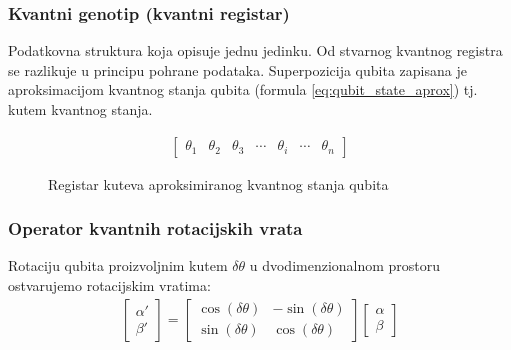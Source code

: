 \documentclass[times, utf8, zavrsni, numeric]{fer}
\begin{document}
\subsubsection{Kvantni genotip (kvantni registar)}
Podatkovna struktura koja opisuje jednu jedinku. Od stvarnog kvantnog registra se razlikuje u principu pohrane podataka. Superpozicija qubita zapisana je aproksimacijom kvantnog stanja qubita (formula \ref{eq:qubit_state_aprox}) tj. kutem kvantnog stanja.
\begin{figure}[htb]
\centering
\begin{align*}
\begin{bmatrix}
\theta_1 & \theta_2 & \theta_3 & \cdots & \theta_i & \cdots & \theta_n
\end{bmatrix}
\end{align*}
\caption{Registar kuteva aproksimiranog kvantnog stanja qubita}
\end{figure}

\subsubsection{Operator kvantnih rotacijskih vrata}
Rotaciju qubita proizvoljnim kutem $\delta\theta$ u dvodimenzionalnom prostoru ostvarujemo rotacijskim vratima:
\begin{align}
\begin{bmatrix}
\alpha' \\ \beta'
\end{bmatrix}
=
\begin{bmatrix}
\cos(\delta\theta) & -\sin(\delta\theta) \\ \sin(\delta\theta) & \cos(\delta\theta)
\end{bmatrix}
\begin{bmatrix}
\alpha \\ \beta
\end{bmatrix}
\end{align} 
\end{document}
